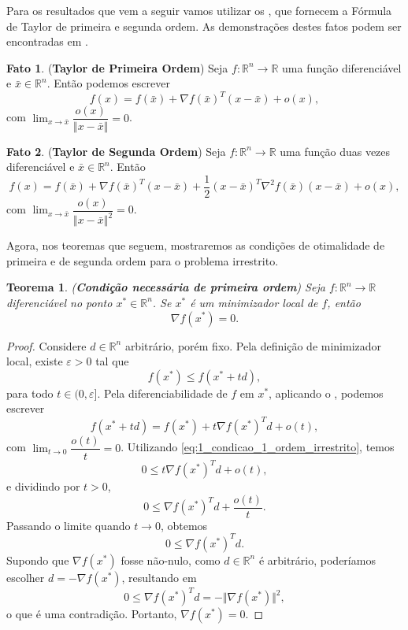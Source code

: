 \documentclass[12pt,a4paper]{scrartcl}
\def\RR{\mathds{R}}
\def\xbar{\bar{x}}
\newtheorem{teo}{Teorema}
\theoremstyle{definition}%
\newtheorem{fato}{Fato}
\begin{document}
Para os resultados que vem a seguir vamos utilizar os , que fornecem a Fórmula de Taylor de primeira e segunda ordem. As demonstrações destes fatos podem ser encontradas em \textcite[p.194]{Elon2019}.


\begin{fato}(\textbf{Taylor de Primeira Ordem}) \label{fato:Taylor_primeira_ordem}
Seja $f:\RR^{n} \rightarrow \RR$ uma função diferenciável e $\xbar \in \RR^{n}$. Então podemos escrever
\[
f(x) = f(\xbar) + \nabla f(\xbar)^{T}(x-\xbar) + o(x),
\]
com $\lim_{x \rightarrow \xbar}\dfrac{o(x)}{\Vert x-\xbar \Vert} = 0$.
\end{fato}

\begin{fato}(\textbf{Taylor de Segunda Ordem}) \label{fato:Taylor_segunda_ordem}
Seja $f:\RR^{n} \rightarrow \RR$ uma função duas vezes diferenciável e $\xbar \in \RR^{n}$. Então
\[
f(x) = f(\xbar) + \nabla f(\xbar)^{T}(x-\xbar) + \dfrac{1}{2}(x-\xbar)^{T}\nabla^{2} f(\xbar)(x-\xbar) + o(x),
\] 
com $\lim_{x \rightarrow \xbar}\dfrac{o(x)}{\Vert x - \xbar \Vert^{2}} = 0$.
\end{fato}

Agora, nos teoremas que seguem, mostraremos as condições de otimalidade de primeira e de segunda ordem para o problema irrestrito.

\begin{teo}(\textbf{Condição necessária de primeira ordem}) \label{teo:condicao_necessaria_1_ordem}
Seja $f:\RR^{n} \rightarrow \RR$ diferenciável no ponto $x^{*} \in \RR^{n}$. Se $x^{*}$ é um minimizador local de $f$, então
\[ \label{eq:condicao_necessaria_1_ordem}
\nabla f(x^{*}) = 0.
\]
\end{teo}
\begin{proof}
Considere $d \in \RR^{n}$ arbitrário, porém fixo. Pela definição de minimizador local, existe $\varepsilon > 0$ tal que 
\[ \label{eq:1_condicao_1_ordem_irrestrito}
f(x^{*}) \leq f(x^{*}+td),
\]
para todo $t\in (0,\varepsilon ]$. Pela diferenciabilidade de $f$ em $x^{*}$, aplicando o , podemos escrever 
\[
f(x^{*}+td) = f(x^{*}) + t\nabla f(x^{*})^{T}d + o(t),
\] 
com $\lim_{t\rightarrow 0} \dfrac{o(t)}{t} =0$. Utilizando \eqref{eq:1_condicao_1_ordem_irrestrito}, temos
\[
0 \leq t\nabla f(x^{*})^{T}d + o(t),
\]
e dividindo por $t>0$, 
\[
0 \leq \nabla f(x^{*})^{T}d + \dfrac{o(t)}{t} .
\]
Passando o limite quando $t\rightarrow 0$, obtemos
\[
0 \leq \nabla f(x^{*})^{T}d .
\]
Supondo que $\nabla f(x^{*})$ fosse não-nulo, como $d \in \RR^{n}$ é arbitrário, poderíamos escolher $d=-\nabla f(x^{*})$, resultando em
\[
0 \leq \nabla f(x^{*})^{T}d = - \Vert \nabla f(x^{*}) \Vert^{2} ,
\]
o que é uma contradição. Portanto, $\nabla f(x^{*}) =0$.
\end{proof}
\end{document}
